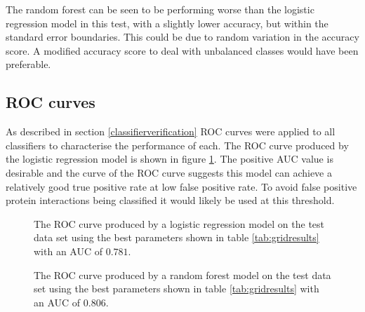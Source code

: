 The random forest can be seen to be performing worse than the logistic regression model in this test, with a slightly lower accuracy, but within the standard error boundaries.
This could be due to random variation in the accuracy score.
A modified accuracy score to deal with unbalanced classes would have been preferable.

\subsection{\ac{ROC} curves}

As described in section \ref{classifierverification} \ac{ROC} curves were applied to all classifiers to characterise the performance of each.
The \ac{ROC} curve produced by the logistic regression model is shown in figure \ref{fig:logroc}.
The positive \ac{AUC} value is desirable and the curve of the \ac{ROC} curve suggests this model can achieve a relatively good true positive rate at low false positive rate.
To avoid false positive protein interactions being classified it would likely be used at this threshold.

\begin{figure}
    \centering
    \setlength\figureheight{2in}
    \setlength\figurewidth{3in}
    \caption{The \ac{ROC} curve produced by a logistic regression model on the test data set using the best parameters shown in table \ref{tab:gridresults} with an \ac{AUC} of $0.781$.}
    \label{fig:logroc}
\end{figure}

\begin{figure}
    \centering
    \setlength\figureheight{2in}
    \setlength\figurewidth{3in}
    \caption{The \ac{ROC} curve produced by a random forest model on the test data set using the best parameters shown in table \ref{tab:gridresults} with an \ac{AUC} of $0.806$.}
    \label{fig:rfroc}
\end{figure}


